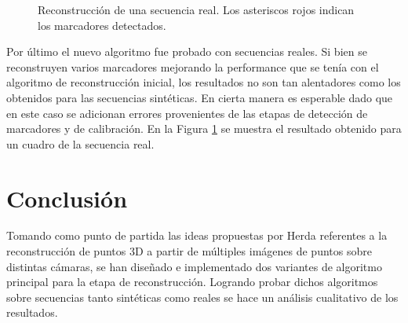\begin{figure}[ht!]
   \caption{Reconstrucción de una secuencia real. Los asteriscos rojos indican los marcadores detectados.} 
   \label{img_reconstruccion_real2}    
\end{figure} 

Por último el nuevo algoritmo fue probado con secuencias reales. Si bien se reconstruyen varios marcadores mejorando la performance que se tenía con el algoritmo de reconstrucción inicial, los resultados no son tan alentadores como los obtenidos para las secuencias sintéticas. En cierta manera es esperable dado que en este caso se adicionan errores provenientes de las etapas de detección de marcadores y de calibración. En la Figura \ref{img_reconstruccion_real2} se muestra el resultado obtenido para un cuadro de la secuencia real. 




\section{Conclusión} 

Tomando como punto de partida las ideas propuestas por Herda referentes a la reconstrucción de puntos 3D a partir de múltiples imágenes de puntos sobre distintas cámaras,  se han diseñado e implementado dos variantes de algoritmo principal para la etapa de reconstrucción. Logrando probar dichos algoritmos sobre secuencias tanto sintéticas como reales se hace un análisis cualitativo de los resultados.



